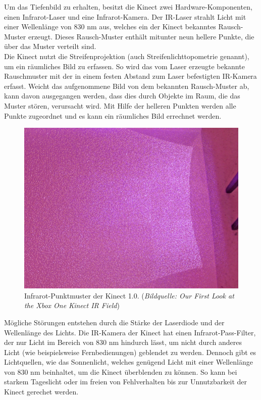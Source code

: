 \documentclass[12pt,a4paper,ngerman]{scrartcl}
\begin{document}
Um das Tiefenbild zu erhalten, besitzt die Kinect zwei Hardware-Komponenten, einen
Infrarot-Laser und eine Infrarot-Kamera. Der IR-Laser strahlt Licht mit einer Wellenlänge
von 830 nm aus, welches ein der Kinect bekanntes Rausch-Muster erzeugt. Dieses Rausch-Muster enthält
mitunter neun hellere Punkte, die über das Muster verteilt sind.\\
Die Kinect nutzt die Streifenprojektion (auch Streifenlichttopometrie genannt), um ein
räumliches Bild zu erfassen. So wird das vom Laser erzeugte bekannte Rauschmuster mit der
in einem festen Abstand zum Laser befestigten IR-Kamera erfasst. Weicht das aufgenommene
Bild von dem bekannten Rausch-Muster ab, kann davon ausgegangen werden, dass dies durch
Objekte im Raum, die das Muster stören, verursacht wird. Mit Hilfe der helleren Punkten werden
alle Punkte zugeordnet und es kann ein räumliches Bild errechnet werden.

\begin{figure}[H]
    \centering
    \includegraphics[scale=0.33]{img/kinect_infrared.jpg}
    \caption{Infrarot-Punktmuster der Kinect 1.0. ({\em Bildquelle: Our First Look at the Xbox One Kinect IR Field\cite{kinect2:infrared}})}
\end{figure}

Mögliche Störungen entstehen durch die Stärke der Laserdiode und der Wellenlänge des Lichts.
Die IR-Kamera der Kinect hat einen Infrarot-Pass-Filter, der nur Licht im Bereich von 830 nm
hindurch lässt, um nicht durch anderes Licht (wie beispielsweise Fernbedienungen) geblendet zu
werden. Dennoch gibt es Lichtquellen, wie das Sonnenlicht, welches genügend Licht mit einer
Wellenlänge von 830 nm  beinhaltet, um die Kinect überblenden zu können. So kann bei starkem
Tageslicht oder im freien von Fehlverhalten bis zur Unnutzbarkeit der Kinect gerechet werden.
\end{document}
